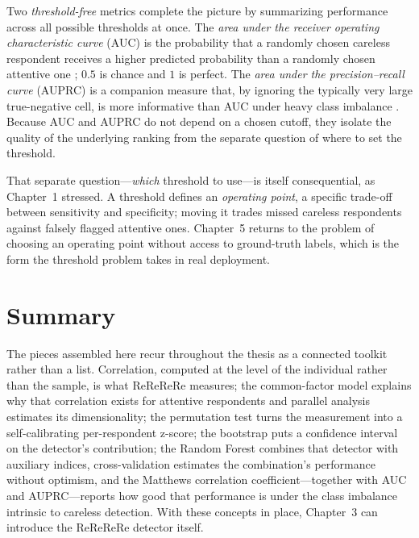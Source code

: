 Two \emph{threshold-free} metrics complete the picture by summarizing
performance across all possible thresholds at once. The \emph{area under the
receiver operating characteristic curve} (AUC) is the probability that a randomly
chosen careless respondent receives a higher predicted probability than a
randomly chosen attentive one \parencite{hanley1982meaning}; $0.5$ is chance and
$1$ is perfect. The \emph{area under the precision--recall curve} (AUPRC) is a
companion measure that, by ignoring the typically very large true-negative cell,
is more informative than AUC under heavy class imbalance
\parencite{saito2015precision}. Because AUC and AUPRC do not depend on a chosen
cutoff, they isolate the quality of the underlying ranking from the separate
question of where to set the threshold.

That separate question---\emph{which} threshold to use---is itself consequential,
as Chapter~1 stressed. A threshold defines an \emph{operating point}, a specific
trade-off between sensitivity and specificity; moving it trades missed careless
respondents against falsely flagged attentive ones. Chapter~5 returns to the
problem of choosing an operating point without access to ground-truth labels,
which is the form the threshold problem takes in real deployment.

\section{Summary}

The pieces assembled here recur throughout the thesis as a connected toolkit
rather than a list. Correlation, computed at the level of the individual rather
than the sample, is what ReReReRe measures; the common-factor model explains why
that correlation exists for attentive respondents and parallel analysis
estimates its dimensionality; the permutation test turns the measurement into a
self-calibrating per-respondent z-score; the bootstrap puts a confidence
interval on the detector's contribution; the Random Forest combines that
detector with auxiliary indices, cross-validation estimates the combination's
performance without optimism, and the Matthews correlation coefficient---together
with AUC and AUPRC---reports how good that performance is under the class
imbalance intrinsic to careless detection. With these concepts in place,
Chapter~3 can introduce the ReReReRe detector itself.

